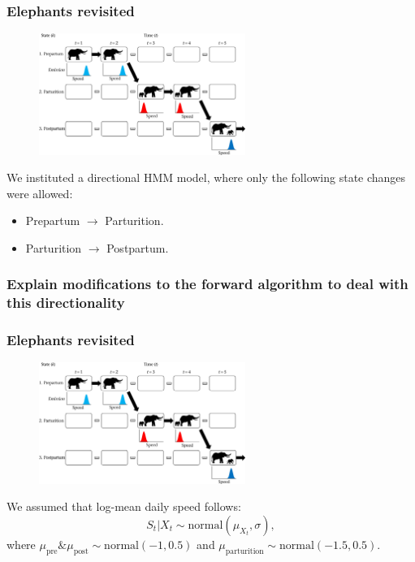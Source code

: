 \documentclass[main.tex]{subfiles}
\begin{document}
\begin{frame}
\frametitle{Elephants revisited}

\begin{figure}
    \centering
    \includegraphics[width=0.6\textwidth]{figures/elephant_parturition.jpg}
\end{figure}

We instituted a directional HMM model, where only the following state changes were allowed:

\begin{itemize}
    \item Prepartum $\rightarrow$ Parturition.
    \item Parturition $\rightarrow$ Postpartum.
\end{itemize}

\end{frame}

\begin{frame}
\frametitle{Explain modifications to the forward algorithm to deal with this directionality}
    
\end{frame}

\begin{frame}
\frametitle{Elephants revisited}

\begin{figure}
    \centering
    \includegraphics[width=0.6\textwidth]{figures/elephant_parturition.jpg}
\end{figure}

We assumed that log-mean daily speed follows:
%
\begin{equation*}
    S_t|X_t \sim \text{normal}(\mu_{X_t}, \sigma),
\end{equation*}
%
where $\mu_{\text{pre}} \& \mu_{\text{post}} \sim \text{normal}(-1, 0.5)$ and $\mu_{\text{parturition}} \sim \text{normal}(-1.5, 0.5)$.

\end{frame}
\end{document}
